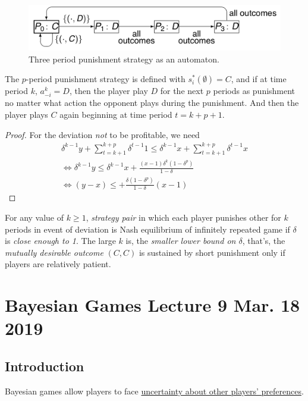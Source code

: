 \documentclass[11pt]{article}
\begin{document}
					\begin{figure}[h]
						\centering
						\includegraphics[width=0.7\linewidth]{fig/3punishment.png}
						\caption{Three period punishment strategy as an automaton.}
					\end{figure}
					\begin{proposition}
						The $p$-period punishment strategy is defined with $s_i^*(\emptyset) = C$, and if at time period $k$, $a_{-i}^k = D$, then the player play $D$ for the next $p$ periods as punishment no matter what action the opponent plays during the punishment. And then the player plays $C$ again beginning at time period $t=k+p+1$.
						\begin{proof}
							For the deviation \emph{not} to be profitable, we need
							\begin{gather}
								\delta^{k-1} y + \sum_{t=k+1}^{k+p} \delta^{t-1} 1 \leq \delta^{k-1} x + \sum_{t=k+1}^{k+p} \delta^{t-1} x \\
								\iff \delta^{k-1} y \leq \delta^{k-1} x + \frac{(x-1)\delta^k (1 - \delta^p)}{1 - \delta} \\
								\iff (y - x)\leq + \frac{\delta(1 - \delta^p)}{1 - \delta}(x - 1)
							\end{gather}
						\end{proof}
					\end{proposition}
					
					\begin{proposition}
						For any value of $k \geq 1$, \emph{strategy pair} in which each player punishes other for $k$ periods in event of deviation is Nash equilibrium of infinitely repeated game if $\delta$ is \emph{close enough to 1}. The large $k$ is, the \emph{smaller lower bound on $\delta$}, that's, the \emph{mutually desirable outcome} $(C,C)$ is sustained by short punishment only if players are relatively patient.
					\end{proposition}
					
	\section{Bayesian Games Lecture 9 Mar. 18 2019}
		\subsection{Introduction}
			\begin{remark}
				Bayesian games allow players to face \ul{uncertainty about other players' preferences}.
			\end{remark}
			
\end{document}
